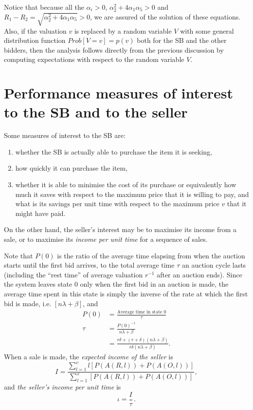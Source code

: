 \documentclass{article}
\begin{document}
Notice that because all the $\alpha_i>0$,
$\alpha_2^2+4\alpha_1\alpha_5>0$ and
$R_1-R_2=\sqrt{\alpha_2^2+4\alpha_1\alpha_5}>0$, we are assured of
the solution of these equations. Also, if the valuation $v$ is
replaced by a random variable $V$ with some general distribution
function $Prob[V=v]=p(v)$ both for the SB and the other bidders,
then the analysis follows directly from the previous discussion by
computing expectations with respect to the random variable $V$.

\section{Performance measures of interest to the SB and to the seller}  \label{Performance}

Some measures of interest to the SB are:
\begin{enumerate}
\item \label{Perf1}whether the SB is actually able to purchase the
item it is seeking, \item \label{Perf2} how quickly it can
purchase the item, \item \label{Perf3} whether it is able to
minimise the cost of its purchase or equivalently how much it
saves with respect to the maximum price that it is willing to pay,
and what is its savings per unit time with respect to the maximum
price $v$ that it might have paid.
\end{enumerate}
On the other hand, the seller's interest may be to maximise its
income from a sale, or to maximise its {\em income per unit time}
for a sequence of sales.

Note that $P(0)$ is the ratio of the average time elapsing from
when the auction starts until the first bid arrives, to the total
average time $\tau$ an auction cycle lasts (including the ``rest
time'' of average valuation $r^{-1}$ after an auction ends). Since
the system leaves state $0$ only when the first bid in an auction
is made, the average time spent in this state is simply the
inverse of the rate at which the first bid is made, i.e.
$[n\lambda + \beta]$, and
\begin{align} \label{eq:FirstModel_P0Definition}
P(0)&=\frac{\text{Average time in state } 0}{\tau}  \\
\tau&=\frac{P(0)^{-1}}{n \lambda+\beta}\nonumber \\
&=\frac{r\delta+(r+\delta)(n\lambda+\beta)}{r\delta(n\lambda+\beta)}
\nonumber.
\end{align}
When a sale is made, the {\em expected income of the seller} is
\begin{equation}
I = \frac{ \sum_{l=1}^v l[P(A(R,l))+P(A(O,l))]}{ \sum_{l=1}^v
[P(A(R,l))+P(A(O,l))]} ,
\end{equation}
and {\em the seller's income per unit time} is
\begin{equation}
\iota = \frac{I}{\tau} \,.
\end{equation}
\end{document}
